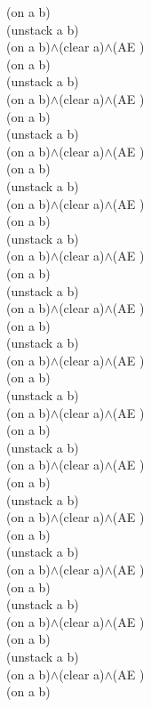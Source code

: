 {{(on a b)\\
(unstack a b)\\
(on a b)$\wedge$(clear a)$\wedge$(AE )\\
(on a b)\\
(unstack a b)\\
(on a b)$\wedge$(clear a)$\wedge$(AE )\\
(on a b)\\
(unstack a b)\\
(on a b)$\wedge$(clear a)$\wedge$(AE )\\
(on a b)\\
(unstack a b)\\
(on a b)$\wedge$(clear a)$\wedge$(AE )\\
(on a b)\\
(unstack a b)\\
(on a b)$\wedge$(clear a)$\wedge$(AE )\\
(on a b)\\
(unstack a b)\\
(on a b)$\wedge$(clear a)$\wedge$(AE )\\
(on a b)\\
(unstack a b)\\
(on a b)$\wedge$(clear a)$\wedge$(AE )\\
(on a b)\\
(unstack a b)\\
(on a b)$\wedge$(clear a)$\wedge$(AE )\\
(on a b)\\
(unstack a b)\\
(on a b)$\wedge$(clear a)$\wedge$(AE )\\
(on a b)\\
(unstack a b)\\
(on a b)$\wedge$(clear a)$\wedge$(AE )\\
(on a b)\\
(unstack a b)\\
(on a b)$\wedge$(clear a)$\wedge$(AE )\\
(on a b)\\
(unstack a b)\\
(on a b)$\wedge$(clear a)$\wedge$(AE )\\
(on a b)\\
(unstack a b)\\
(on a b)$\wedge$(clear a)$\wedge$(AE )\\
(on a b)\\
}%
}

